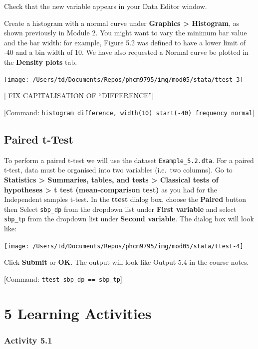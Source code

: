 \documentclass[
]{memoir}
\begin{document}
Check that the new variable appears in your Data Editor window.

Create a histogram with a normal curve under \textbf{Graphics \textgreater{} Histogram}, as shown previously in Module 2. You might want to vary the minimum bar value and the bar width: for example, Figure 5.2 was defined to have a lower limit of -40 and a bin width of 10. We have also requested a Normal curve be plotted in the \textbf{Density plots} tab.

\texttt{[image: /Users/td/Documents/Repos/phcm9795/img/mod05/stata/ttest-3]}

{[} FIX CAPITALISATION OF ``DIFFERENCE''{]}

{[}Command: \texttt{histogram\ difference,\ width(10)\ start(-40)\ frequency\ normal}{]}

\hypertarget{paired-t-test}{%
\section{Paired t-Test}\label{paired-t-test}}

To perform a paired t-test we will use the dataset \texttt{Example\_5.2.dta}. For a paired t-test, data must be organised into two variables (i.e.~two columns). Go to \textbf{Statistics \textgreater{} Summaries, tables, and tests \textgreater{} Classical tests of hypotheses \textgreater{} t test (mean-comparison test)} as you had for the Independent samples t-test. In the \textbf{ttest} dialog box, choose the \textbf{Paired} button then Select \texttt{sbp\_dp} from the dropdown list under \textbf{First variable} and select \texttt{sbp\_tp} from the dropdown list under \textbf{Second variable}. The dialog box will look like:

\texttt{[image: /Users/td/Documents/Repos/phcm9795/img/mod05/stata/ttest-4]}

Click \textbf{Submit} or \textbf{OK}. The output will look like Output 5.4 in the course notes.

{[}Command: \texttt{ttest\ sbp\_dp\ ==\ sbp\_tp}{]}

\hypertarget{learning-activities-4}{%
\chapter*{\texorpdfstring{\textbf{5} Learning Activities}{5 Learning Activities}}\label{learning-activities-4}}

\hypertarget{activity-5.1}{%
\subsection*{Activity 5.1}\label{activity-5.1}}
\end{document}
